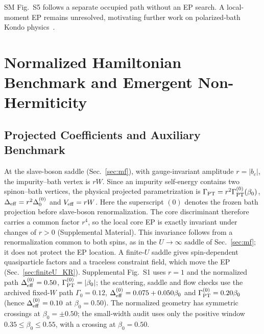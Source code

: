 \documentclass[%
  aps,physrev,onecolumn,10pt,amsmath,amssymb,superscriptaddress,longbibliography,floatfix
]{revtex4-2}
\newcommand{\gb}{\beta_0}               %
\newcommand{\Gpt}{\Gamma_{\mathrm{PT}}}   %
\newcommand{\Deff}{\Delta_{\rm eff}}     %
\newcommand{\Veff}{V_{\rm eff}}           %
\begin{document}
SM Fig.~S5 follows a separate occupied path without an EP search.  A
local-moment EP remains unresolved, motivating further work on
polarized-bath Kondo physics~\cite{Martinek2003NRG,Sindel2007}.



\FloatBarrier
\section{Normalized Hamiltonian Benchmark and Emergent Non-Hermiticity}
\label{sec:Hss}

\subsection{Projected Coefficients and Auxiliary Benchmark}
\label{sec:deriveHss}

At the slave-boson saddle (Sec.~\ref{sec:mf}), with gauge-invariant amplitude $r=|b_c|$, the impurity--bath vertex is $rW$.  Since an impurity self-energy
contains two spinon--bath vertices, the physical projected parametrization is $\Gpt=r^2\Gamma_{\rm PT}^{(0)}(\gb)$, $\Deff=r^2\Delta_0^{(0)}$ and $\Veff=rW$.
Here the superscript $(0)$ denotes the frozen bath projection before
slave-boson renormalization.  The core discriminant therefore carries a
common factor $r^4$, so the local core EP is exactly invariant under changes
of $r>0$ (Supplemental Material).  This invariance follows from a
renormalization common to both spins, as in the $U\to\infty$ saddle of
Sec.~\ref{sec:mf}; it does not protect the EP location.  A finite-$U$ saddle
gives spin-dependent quasiparticle factors and a traceless constraint field,
which move the EP (Sec.~\ref{sec:finiteU_KR}).
Supplemental Fig.~S1 uses $r=1$ and the normalized path $\Delta_{\rm eff}^{(0)}=0.50$, $\Gamma_{\rm PT}^{(0)}=|\beta_0|$; the scattering, saddle and flow checks use the archived fixed-$W$ path
$\Gamma_0=0.12$, $\Delta_{\rm eff}^{(0)}=0.075+0.050\beta_0$ and $\Gamma_{\rm PT}^{(0)}=0.20\beta_0$ (hence $\Delta_{\rm eff}^{(0)}=0.10$
at $\beta_0=0.50$).  The normalized geometry has symmetric crossings at
$\beta_0=\pm0.50$; the small-width audit uses only the positive window
$0.35\leq\beta_0\leq0.55$, with a crossing at $\beta_0=0.50$.
\end{document}
